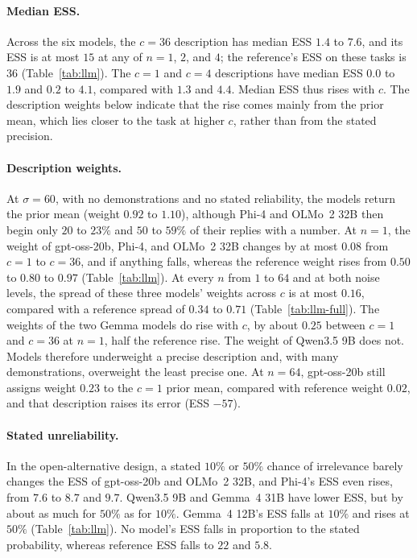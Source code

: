 \paragraph{Median ESS.}
Across the six models, the $c = 36$ description has median ESS $1.4$ to $7.6$, and its ESS is at most $15$ at any of $n = 1$, $2$, and $4$; the reference's ESS on these tasks is $36$ (Table~\ref{tab:llm}). The $c = 1$ and $c = 4$ descriptions have median ESS $0.0$ to $1.9$ and $0.2$ to $4.1$, compared with $1.3$ and $4.4$. Median ESS thus rises with $c$. The description weights below indicate that the rise comes mainly from the prior mean, which lies closer to the task at higher $c$, rather than from the stated precision.

\paragraph{Description weights.}
At $\sigma = 60$, with no demonstrations and no stated reliability, the models return the prior mean (weight $0.92$ to $1.10$), although Phi-4 and OLMo~2 32B then begin only $20$ to $23\%$ and $50$ to $59\%$ of their replies with a number. At $n = 1$, the weight of gpt-oss-20b, Phi-4, and OLMo~2 32B changes by at most $0.08$ from $c = 1$ to $c = 36$, and if anything falls, whereas the reference weight rises from $0.50$ to $0.80$ to $0.97$ (Table~\ref{tab:llm}). At every $n$ from $1$ to $64$ and at both noise levels, the spread of these three models' weights across $c$ is at most $0.16$, compared with a reference spread of $0.34$ to $0.71$ (Table~\ref{tab:llm-full}). The weights of the two Gemma models do rise with $c$, by about $0.25$ between $c = 1$ and $c = 36$ at $n = 1$, half the reference rise. The weight of Qwen3.5 9B does not. Models therefore underweight a precise description and, with many demonstrations, overweight the least precise one. At $n = 64$, gpt-oss-20b still assigns weight $0.23$ to the $c = 1$ prior mean, compared with reference weight $0.02$, and that description raises its error (ESS $-57$).

\paragraph{Stated unreliability.}
In the open-alternative design, a stated $10\%$ or $50\%$ chance of irrelevance barely changes the ESS of gpt-oss-20b and OLMo~2 32B, and Phi-4's ESS even rises, from $7.6$ to $8.7$ and $9.7$. Qwen3.5 9B and Gemma~4 31B have lower ESS, but by about as much for $50\%$ as for $10\%$. Gemma~4 12B's ESS falls at $10\%$ and rises at $50\%$ (Table~\ref{tab:llm}). No model's ESS falls in proportion to the stated probability, whereas reference ESS falls to $22$ and $5.8$.

